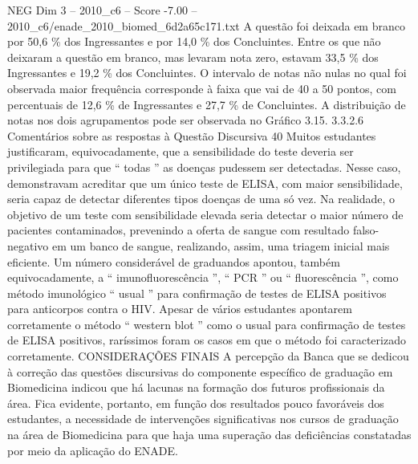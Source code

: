 \begin{textsample}{NEG Dim 3 – 2010\_c6 – Score -7.00 – 2010\_c6/enade\_2010\_biomed\_6d2a65c171.txt}
A questão foi deixada em branco por 50,6 \% dos Ingressantes e por 14,0 \% dos Concluintes.
Entre os que não deixaram a questão em branco, mas levaram nota zero, estavam 33,5 \% dos Ingressantes e 19,2 \% dos Concluintes.
O intervalo de notas não nulas no qual foi observada maior frequência corresponde à faixa que vai de 40 a 50 pontos, com percentuais de 12,6 \% de Ingressantes e 27,7 \% de Concluintes.
A distribuição de notas nos dois agrupamentos pode ser observada no Gráfico 3.15. 3.3.2.6 Comentários sobre as respostas à Questão Discursiva 40 Muitos estudantes justificaram, equivocadamente, que a sensibilidade do teste deveria ser privilegiada para que “ todas ” as doenças pudessem ser detectadas.
Nesse caso, demonstravam acreditar que um único teste de ELISA, com maior sensibilidade, seria capaz de detectar diferentes tipos doenças de uma só vez.
Na realidade, o objetivo de um teste com sensibilidade elevada seria detectar o maior número de pacientes contaminados, prevenindo a oferta de sangue com resultado falso-negativo em um banco de sangue, realizando, assim, uma triagem inicial mais eficiente.
Um número considerável de graduandos apontou, também equivocadamente, a “ imunofluorescência ”, “ PCR ” ou “ fluorescência ”, como método imunológico “ usual ” para confirmação de testes de ELISA positivos para anticorpos contra o HIV.
Apesar de vários estudantes apontarem corretamente o método “ western blot ” como o usual para confirmação de testes de ELISA positivos, raríssimos foram os casos em que o método foi caracterizado corretamente.
CONSIDERAÇÕES FINAIS A percepção da Banca que se dedicou à correção das questões discursivas do componente específico de graduação em Biomedicina indicou que há lacunas na formação dos futuros profissionais da área.
Fica evidente, portanto, em função dos resultados pouco favoráveis dos estudantes, a necessidade de intervenções significativas nos cursos de graduação na área de Biomedicina para que haja uma superação das deficiências constatadas por meio da aplicação do ENADE.

\end{textsample}
